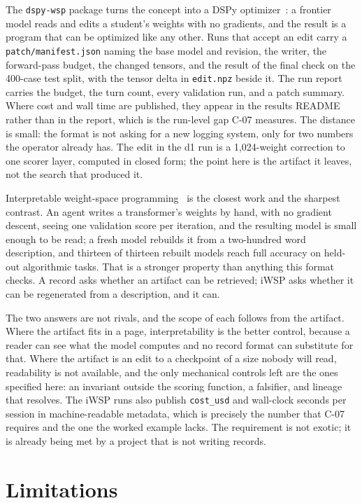 \documentclass[11pt]{article}
\begin{document}
The \texttt{dspy-wsp} package turns the concept into a DSPy
optimizer~\cite{dspy}: a frontier model reads and edits a student's weights with
no gradients, and the result is a program that can be optimized like any other.
Runs that accept an edit carry a \texttt{patch/manifest.json} naming the base
model and revision, the writer, the forward-pass budget, the changed tensors, and
the result of the final check on the 400-case test split, with the tensor delta
in \texttt{edit.npz} beside it. The run report carries the budget, the turn
count, every validation run, and a patch summary. Where cost and wall time are
published, they appear in the results README rather than in the report, which is
the run-level gap C-07 measures. The distance is small: the format is not asking
for a new logging system, only for two numbers the operator already has. The
edit in the d1 run is a 1,024-weight correction to one scorer layer, computed in
closed form; the point here is the artifact it leaves, not the search that
produced it.

Interpretable weight-space programming~\cite{iwsp} is the closest work and the
sharpest contrast. An agent writes a transformer's weights by hand, with no
gradient descent, seeing one validation score per iteration, and the resulting
model is small enough to be read; a fresh model rebuilds it from a two-hundred
word description, and thirteen of thirteen rebuilt models reach full accuracy on
held-out algorithmic tasks. That is a stronger property than anything this
format checks. A record asks whether an artifact can be retrieved; iWSP asks
whether it can be regenerated from a description, and it can.

The two answers are not rivals, and the scope of each follows from the artifact.
Where the artifact fits in a page, interpretability is the better control,
because a reader can see what the model computes and no record format can
substitute for that. Where the artifact is an edit to a checkpoint of a size
nobody will read, readability is not available, and the only mechanical
controls left are the ones specified here: an invariant outside the scoring
function, a falsifier, and lineage that resolves. The iWSP runs also publish
\texttt{cost\_usd} and wall-clock seconds per session in machine-readable
metadata, which is precisely the number that C-07 requires and the one the
worked example lacks. The requirement is not exotic; it is already being met by
a project that is not writing records.

\section{Limitations}
\end{document}
